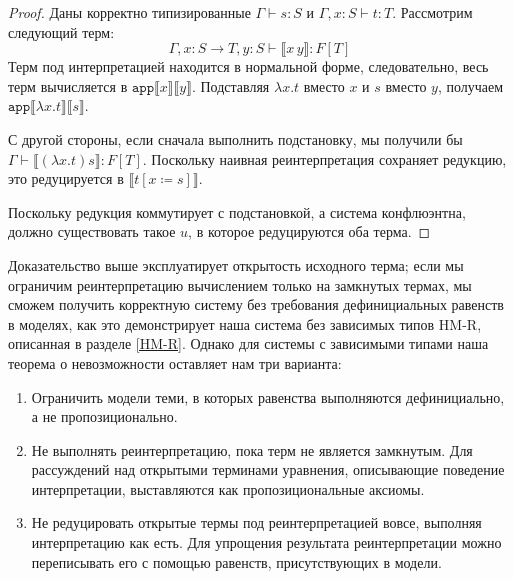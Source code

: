 \begin{proof}
    Даны корректно типизированные $\Gamma\vdash s:S$ и
    $\Gamma,x:S\vdash t:T$. Рассмотрим следующий терм:
    \[
        \Gamma,x:S\to T,y:S\vdash
        \llbracket x\,y\rrbracket:F[T]
    \]
    Терм под интерпретацией находится в нормальной
    форме, следовательно, весь терм вычисляется в
    $\mathtt{app}\llbracket x\rrbracket
    \llbracket y\rrbracket$. Подставляя $\lambda x.t$
    вместо $x$ и $s$ вместо $y$, получаем
    $\mathtt{app}\llbracket\lambda x.t\rrbracket
    \llbracket s \rrbracket$.

    С другой стороны, если сначала выполнить
    подстановку, мы получили бы
    $\Gamma\vdash\llbracket(\lambda x.t)s
    \rrbracket:F[T]$. Поскольку наивная реинтерпретация
    сохраняет редукцию, это редуцируется в
    $\llbracket t[x\coloneqq s] \rrbracket$.

    Поскольку редукция коммутирует с подстановкой, а
    система конфлюэнтна, должно существовать такое $u$,
    в которое редуцируются оба терма.
\end{proof}

Доказательство выше эксплуатирует открытость исходного
терма; если мы ограничим реинтерпретацию вычислением
только на замкнутых термах, мы сможем получить
корректную систему без требования дефинициальных
равенств в моделях, как это демонстрирует наша система
без зависимых типов HM-R, описанная в разделе
\ref{HM-R}. Однако для системы с зависимыми типами наша
теорема о невозможности оставляет нам три варианта:

\begin{enumerate}
    \item Ограничить модели теми, в которых равенства
        выполняются дефинициально, а не
        пропозиционально.
    \item Не выполнять реинтерпретацию, пока терм не
        является замкнутым. Для рассуждений над
        открытыми терминами уравнения, описывающие
        поведение интерпретации, выставляются как
        пропозициональные аксиомы.
    \item Не редуцировать открытые термы под
        реинтерпретацией вовсе, выполняя интерпретацию 
        как есть. Для упрощения результата
        реинтерпретации можно переписывать его с
        помощью равенств, присутствующих в модели.
\end{enumerate}


